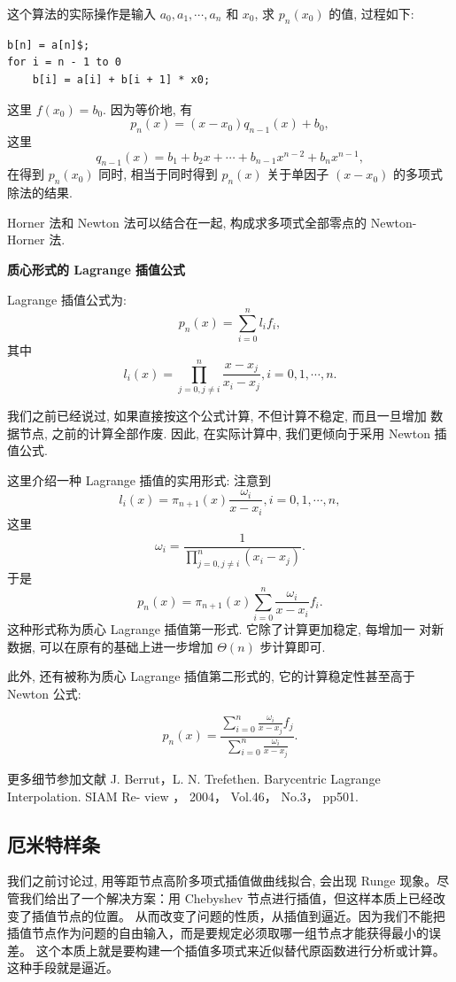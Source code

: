 \documentclass[a4paper]{ctexart}
\begin{document}
{这个算法的实际操作是输入 $a_0, a_1, \cdots, a_n$ 和 $x_0$, 求
$p_n(x_0)$ 的值, 过程如下:

\begin{verbatim}
b[n] = a[n]$;
for i = n - 1 to 0
    b[i] = a[i] + b[i + 1] * x0;
\end{verbatim}

这里 $f(x_0) = b_0$.  因为等价地, 有
$$
p_n(x) = (x - x_0)q_{n - 1}(x) + b_0,
$$
这里
$$
q_{n - 1}(x) = b_1 + b_2 x + \cdots + b_{n - 1} x^{n - 2} + b_n x^{n - 1},
$$
在得到 $p_n(x_0)$ 同时, 相当于同时得到 $p_n(x)$ 关于单因子 $(x -
x_0)$ 的多项式除法的结果.

Horner 法和 Newton 法可以结合在一起, 构成求多项式全部零点的
Newton-Horner 法.

{\bf 质心形式的 Lagrange 插值公式}

Lagrange 插值公式为:
$$
p_n(x) = \sum_{i = 0}^n l_i f_i,
$$
其中
$$
l_i(x) = \prod_{j = 0, j \neq i}^n \frac{x - x_j}{x_i - x_j}, i = 0, 1, \cdots, n.
$$

我们之前已经说过, 如果直接按这个公式计算, 不但计算不稳定, 而且一旦增加
数据节点, 之前的计算全部作废. 因此, 在实际计算中, 我们更倾向于采用
Newton 插值公式.

这里介绍一种 Lagrange 插值的实用形式: 注意到
$$
l_i(x) = \pi_{n + 1}(x) \frac{\omega_i}{x - x_i}, i = 0, 1, \cdots, n,
$$
这里
$$
\omega_i = \frac{1}{\displaystyle \prod_{j = 0, j \neq i}^n (x_i - x_j)}.
$$
于是
$$
p_n(x) = \pi_{n + 1}(x)\sum_{i = 0}^n \frac{\omega_i}{x - x_i} f_i.
$$
这种形式称为质心 Lagrange 插值第一形式. 它除了计算更加稳定, 每增加一
对新数据, 可以在原有的基础上进一步增加 $\Theta(n)$ 步计算即可.

此外, 还有被称为质心 Lagrange 插值第二形式的, 它的计算稳定性甚至高于
Newton 公式:

$$
p_n(x) = \frac{\displaystyle\sum_{i = 0}^n\frac{\omega_i}{x - x_j} f_j}
  {\displaystyle\sum_{i = 0}^n\frac{\omega_i}{x - x_j}}.
$$

更多细节参加文献 J. Berrut，L. N. Trefethen. Barycentric Lagrange Interpolation. SIAM Re-
view ， 2004， Vol.46， No.3， pp501.

\subsection{厄米特样条}

我们之前讨论过, 用等距节点高阶多项式插值做曲线拟合, 会出现 Runge 现象。尽管我们给出了一个解决方案：用 Chebyshev 节点进行插值，但这样本质上已经改变了插值节点的位置。
从而改变了问题的性质，从插值到逼近。因为我们不能把插值节点作为问题的自由输入，而是要规定必须取哪一组节点才能获得最小的误差。
这个本质上就是要构建一个插值多项式来近似替代原函数进行分析或计算。这种手段就是逼近。

}
\end{document}
